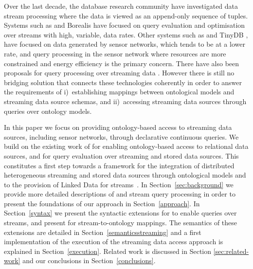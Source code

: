 Over the last decade, the database research community have investigated data stream processing where the data is viewed as an append-only sequence of tuples.
Systems such as \stream \cite{Arasu_06a} and Borealis \cite{Abadi_2005} have focused on query evaluation and optimisation over streams with high, variable, data rates.
Other systems such as \snee \cite{Galpin_09} and TinyDB \cite{Madden_05}, have focused on data generated by sensor networks, which tends to be at a lower rate, and query processing in the sensor network where resources are more constrained and energy efficiency is the primary concern.
There have also been proposals for query processing over streaming \rdf data \cite{Bolles_08,Barbieri2010An-Execution-En}.
However there is still no bridging solution that connects these technologies coherently in order to answer the requirements of %
i)~establishing mappings between ontological models and streaming data source schemas, and %
ii)~accessing streaming data sources through queries over ontology models.

In this paper we focus on providing ontology-based access to streaming data sources, including sensor networks, through declarative continuous queries.
We build on the existing work of \rtwoo for enabling ontology-based access to relational data sources, and \snee for query evaluation over streaming and stored data sources.
This constitutes a first step towards a framework for the integration of distributed heterogeneous streaming and stored data sources through ontological models and to the provision of Linked Data for streams~\cite{LePhuoc_09,Page_09,Sequeda_09}.
In Section~\ref{sec:background} we provide more detailed descriptions of \rtwoo and stream query processing in order to present the foundations of our approach in Section~\ref{approach}. 
In Section~\ref{syntax} we present the syntactic extensions for \sparql to enable queries over \rdf streams, and present \stwoo for stream-to-ontology mappings. 
The semantics of these extensions are detailed in Section~\ref{semanticsstreaming} and a first implementation of the execution of the streaming data access approach is explained in Section~\ref{execution}.
Related work is discussed in Section \ref{sec:related-work} and our conclusions in Section~\ref{conclusions}. 


